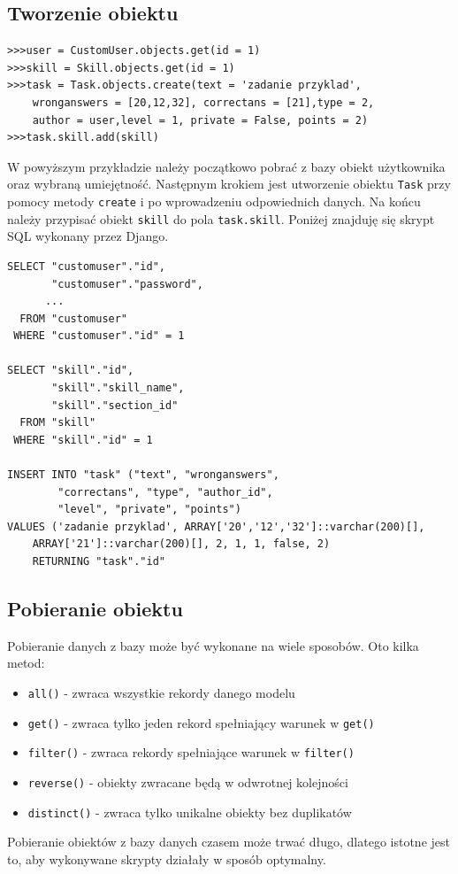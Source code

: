 \documentclass[oneside,polski,logo,indent]{amuthesis}
\begin{document}
\begin{center}
\subsection{Tworzenie obiektu}
\end{center}
\begin{lstlisting}[style=DOS]
>>>user = CustomUser.objects.get(id = 1)
>>>skill = Skill.objects.get(id = 1)
>>>task = Task.objects.create(text = 'zadanie przyklad',
	wronganswers = [20,12,32], correctans = [21],type = 2,
	author = user,level = 1, private = False, points = 2)
>>>task.skill.add(skill)

\end{lstlisting}
W powyższym przykładzie należy początkowo pobrać z bazy obiekt użytkownika oraz wybraną umiejętność. Następnym krokiem jest utworzenie obiektu \texttt{Task} przy pomocy metody \texttt{create} i po wprowadzeniu odpowiednich danych. Na końcu należy przypisać obiekt \texttt{skill} do pola \texttt{task.skill}. Poniżej znajduję się skrypt SQL wykonany przez Django.
\begin{lstlisting}[style=DOS]
SELECT "customuser"."id",
       "customuser"."password",
	  ...
  FROM "customuser"
 WHERE "customuser"."id" = 1

SELECT "skill"."id",
       "skill"."skill_name",
       "skill"."section_id"
  FROM "skill"
 WHERE "skill"."id" = 1

INSERT INTO "task" ("text", "wronganswers",
		"correctans", "type", "author_id",
		"level", "private", "points")
VALUES ('zadanie przyklad', ARRAY['20','12','32']::varchar(200)[],
	ARRAY['21']::varchar(200)[], 2, 1, 1, false, 2) 
	RETURNING "task"."id"
\end{lstlisting}

\begin{center}
\subsection{Pobieranie obiektu}
\end{center}
Pobieranie danych z bazy może być wykonane na wiele sposobów. Oto kilka metod:
\begin{itemize}
\item \texttt{all()} - zwraca wszystkie rekordy danego modelu
\item \texttt{get()} - zwraca tylko jeden rekord spełniający warunek w \texttt{get()}
\item \texttt{filter()} - zwraca rekordy spełniające warunek w \texttt{filter()}
\item \texttt{reverse()} - obiekty zwracane będą w odwrotnej kolejności
\item \texttt{distinct()} - zwraca tylko unikalne obiekty bez duplikatów
\end{itemize}
Pobieranie obiektów z bazy danych czasem może trwać długo, dlatego istotne jest to, aby wykonywane skrypty działały w sposób optymalny. 
\end{document}
